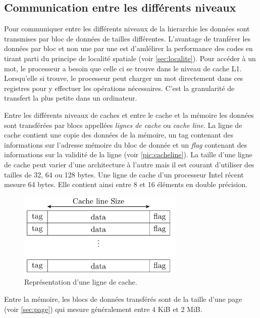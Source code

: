 \subsection{Communication entre les différents niveaux}
Pour communiquer entre les différents niveaux de la hierarchie les données sont transmises par bloc de données de tailles différentes. L'avantage de tranférer les données par bloc et non une par une est d'amlélirer la performance des codes en tirant parti du principe de localité spatiale (voir \autoref{sec:localite}).
Pour accéder à un mot, le processeur a besoin que celle ci se trouve dans le niveau de cache L1. Lorsqu'elle si trouve, le processeur peut charger un mot directement dans ces registres pour y effectuer les opérations nécessaires. C'est la granularité de transfert la plus petite dans un ordinateur. 

Entre les différents niveaux de caches et entre le cache et la mémoire les données sont transférées par blocs appellées \textit{lignes de cache} ou \textit{cache line}. La ligne de cache contient une copie des données de la mémoire, un tag contenant des informations sur l'adresse mémoire du bloc de donnée et un \textit{flag} contenant des informations sur la validité de la ligne (voir \autoref{pic:cacheline}). La taille d'une ligne de cache peut varier d'une architecture à l'autre mais il est courant d'utiliser des tailles de 32, 64 ou 128 bytes. Une ligne de cache d'un processeur Intel récent mesure 64 bytes. Elle contient ainsi entre 8 et 16 éléments en double précision. 

\begin{figure}
    \center
    \includegraphics[width=8cm]{images/cacheline_def.png}
    \caption{\label{pic:cacheline} Représentation d'une ligne de cache.}
\end{figure}


Entre la mémoire, les blocs de données transférés sont de la taille d'une page (voir \autoref{sec:page}) qui mesure généralement entre 4 KiB et 2 MiB.




